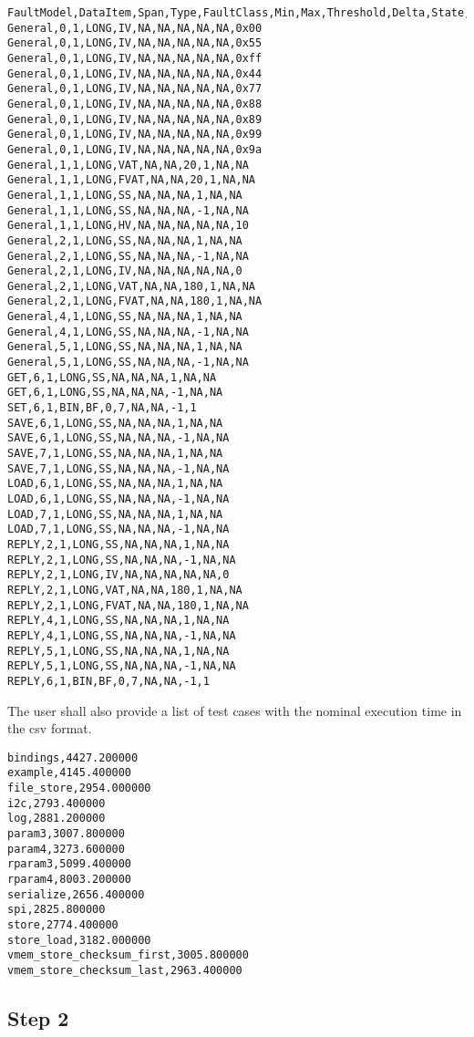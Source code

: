 \begin{lstlisting}
FaultModel,DataItem,Span,Type,FaultClass,Min,Max,Threshold,Delta,State,Value
General,0,1,LONG,IV,NA,NA,NA,NA,NA,0x00
General,0,1,LONG,IV,NA,NA,NA,NA,NA,0x55
General,0,1,LONG,IV,NA,NA,NA,NA,NA,0xff
General,0,1,LONG,IV,NA,NA,NA,NA,NA,0x44
General,0,1,LONG,IV,NA,NA,NA,NA,NA,0x77
General,0,1,LONG,IV,NA,NA,NA,NA,NA,0x88
General,0,1,LONG,IV,NA,NA,NA,NA,NA,0x89
General,0,1,LONG,IV,NA,NA,NA,NA,NA,0x99
General,0,1,LONG,IV,NA,NA,NA,NA,NA,0x9a
General,1,1,LONG,VAT,NA,NA,20,1,NA,NA
General,1,1,LONG,FVAT,NA,NA,20,1,NA,NA
General,1,1,LONG,SS,NA,NA,NA,1,NA,NA
General,1,1,LONG,SS,NA,NA,NA,-1,NA,NA
General,1,1,LONG,HV,NA,NA,NA,NA,NA,10
General,2,1,LONG,SS,NA,NA,NA,1,NA,NA
General,2,1,LONG,SS,NA,NA,NA,-1,NA,NA
General,2,1,LONG,IV,NA,NA,NA,NA,NA,0
General,2,1,LONG,VAT,NA,NA,180,1,NA,NA
General,2,1,LONG,FVAT,NA,NA,180,1,NA,NA
General,4,1,LONG,SS,NA,NA,NA,1,NA,NA
General,4,1,LONG,SS,NA,NA,NA,-1,NA,NA
General,5,1,LONG,SS,NA,NA,NA,1,NA,NA
General,5,1,LONG,SS,NA,NA,NA,-1,NA,NA
GET,6,1,LONG,SS,NA,NA,NA,1,NA,NA
GET,6,1,LONG,SS,NA,NA,NA,-1,NA,NA
SET,6,1,BIN,BF,0,7,NA,NA,-1,1
SAVE,6,1,LONG,SS,NA,NA,NA,1,NA,NA
SAVE,6,1,LONG,SS,NA,NA,NA,-1,NA,NA
SAVE,7,1,LONG,SS,NA,NA,NA,1,NA,NA
SAVE,7,1,LONG,SS,NA,NA,NA,-1,NA,NA
LOAD,6,1,LONG,SS,NA,NA,NA,1,NA,NA
LOAD,6,1,LONG,SS,NA,NA,NA,-1,NA,NA
LOAD,7,1,LONG,SS,NA,NA,NA,1,NA,NA
LOAD,7,1,LONG,SS,NA,NA,NA,-1,NA,NA
REPLY,2,1,LONG,SS,NA,NA,NA,1,NA,NA
REPLY,2,1,LONG,SS,NA,NA,NA,-1,NA,NA
REPLY,2,1,LONG,IV,NA,NA,NA,NA,NA,0
REPLY,2,1,LONG,VAT,NA,NA,180,1,NA,NA
REPLY,2,1,LONG,FVAT,NA,NA,180,1,NA,NA
REPLY,4,1,LONG,SS,NA,NA,NA,1,NA,NA
REPLY,4,1,LONG,SS,NA,NA,NA,-1,NA,NA
REPLY,5,1,LONG,SS,NA,NA,NA,1,NA,NA
REPLY,5,1,LONG,SS,NA,NA,NA,-1,NA,NA
REPLY,6,1,BIN,BF,0,7,NA,NA,-1,1
\end{lstlisting}

The user shall also provide a list of test cases with the nominal execution time in the csv format.

\begin{lstlisting}
bindings,4427.200000
example,4145.400000
file_store,2954.000000
i2c,2793.400000
log,2881.200000
param3,3007.800000
param4,3273.600000
rparam3,5099.400000
rparam4,8003.200000
serialize,2656.400000
spi,2825.800000
store,2774.400000
store_load,3182.000000
vmem_store_checksum_first,3005.800000
vmem_store_checksum_last,2963.400000
\end{lstlisting}

\subsection{Step 2}

